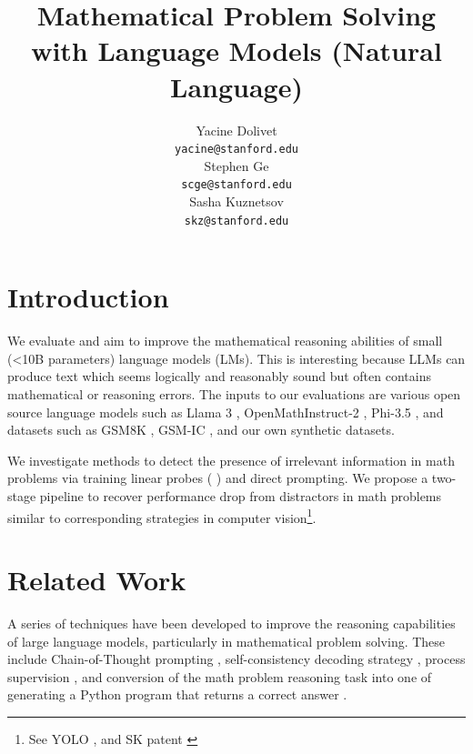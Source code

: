 \documentclass{article}
\title{Mathematical Problem Solving with Language Models (Natural Language)
}
\author{
  Yacine Dolivet\\
  \texttt{yacine@stanford.edu} \\
  \And
  Stephen Ge\\
  \texttt{scge@stanford.edu} \\
   \And
  Sasha Kuznetsov\\
  \texttt{skz@stanford.edu} \\
}
\begin{document}
\maketitle




\section{Introduction}
We evaluate and aim to improve the mathematical reasoning abilities of small (<10B parameters) language models (LMs). This is interesting because LLMs can produce text which seems logically and reasonably sound but often contains mathematical or reasoning errors. The inputs to our evaluations are various open source language models such as Llama 3 \citep{dubey}, OpenMathInstruct-2 \citep{toshniwal}, Phi-3.5 \citep{abdin}, and datasets such as GSM8K \citep{cobbe}, GSM-IC \citep{shi}, and our own synthetic datasets.

We investigate methods to detect the presence of irrelevant information in math problems via training linear probes (\citep{alain} \citep{hewitt}) and direct prompting. We propose a two-stage pipeline to recover performance drop from distractors in math problems similar to corresponding strategies in computer vision\footnote{See YOLO \citep{redmon}, and SK patent \citep{US20230091374A1}}.

\section{Related Work}
A series of techniques have been developed to improve the reasoning capabilities of large language models, particularly in mathematical problem solving. These include Chain-of-Thought prompting \citep{wei}, self-consistency decoding strategy \citep{wang}, process supervision \citep{lightman}, and conversion of the math problem reasoning task into one of generating a Python program that returns a correct answer \citep{chowdhery}.
\end{document}
